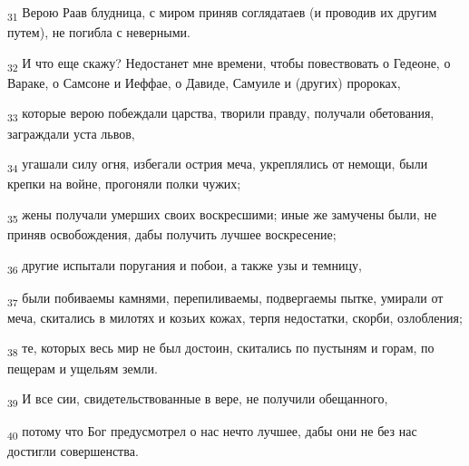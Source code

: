 \begin{tcolorbox}
\textsubscript{31} Верою Раав блудница, с миром приняв соглядатаев (и проводив их другим путем), не погибла с неверными.
\end{tcolorbox}
\begin{tcolorbox}
\textsubscript{32} И что еще скажу? Недостанет мне времени, чтобы повествовать о Гедеоне, о Вараке, о Самсоне и Иеффае, о Давиде, Самуиле и (других) пророках,
\end{tcolorbox}
\begin{tcolorbox}
\textsubscript{33} которые верою побеждали царства, творили правду, получали обетования, заграждали уста львов,
\end{tcolorbox}
\begin{tcolorbox}
\textsubscript{34} угашали силу огня, избегали острия меча, укреплялись от немощи, были крепки на войне, прогоняли полки чужих;
\end{tcolorbox}
\begin{tcolorbox}
\textsubscript{35} жены получали умерших своих воскресшими; иные же замучены были, не приняв освобождения, дабы получить лучшее воскресение;
\end{tcolorbox}
\begin{tcolorbox}
\textsubscript{36} другие испытали поругания и побои, а также узы и темницу,
\end{tcolorbox}
\begin{tcolorbox}
\textsubscript{37} были побиваемы камнями, перепиливаемы, подвергаемы пытке, умирали от меча, скитались в милотях и козьих кожах, терпя недостатки, скорби, озлобления;
\end{tcolorbox}
\begin{tcolorbox}
\textsubscript{38} те, которых весь мир не был достоин, скитались по пустыням и горам, по пещерам и ущельям земли.
\end{tcolorbox}
\begin{tcolorbox}
\textsubscript{39} И все сии, свидетельствованные в вере, не получили обещанного,
\end{tcolorbox}
\begin{tcolorbox}
\textsubscript{40} потому что Бог предусмотрел о нас нечто лучшее, дабы они не без нас достигли совершенства.
\end{tcolorbox}
